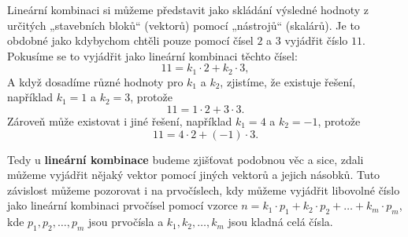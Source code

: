 \begin{remark}
    Lineární kombinaci si můžeme představit jako skládání výsledné hodnoty z určitých „stavebních bloků“ (vektorů) pomocí „nástrojů“ (skalárů).
    Je to obdobné jako kdybychom chtěli pouze pomocí čísel $2$ a $3$ vyjádřit číslo $11$. Pokusíme se to vyjádřit jako lineární kombinaci těchto čísel:
    \[
    11 = k_1 \cdot 2 + k_2 \cdot 3,
    \]
    A když dosadíme různé hodnoty pro $k_1$ a $k_2$, zjistíme, že existuje řešení, například $k_1 = 1$ a $k_2 = 3$, protože
    \[
    11 = 1 \cdot 2 + 3 \cdot 3.
    \]
    Zároveň může existovat i jiné řešení, například $k_1 = 4$ a $k_2 = -1$, protože
    \[
    11 = 4 \cdot 2 + (-1) \cdot 3.
    \]

    Tedy u \textbf{lineární kombinace} budeme zjišťovat podobnou věc a sice, zdali můžeme vyjádřit nějaký vektor pomocí jiných vektorů a jejich násobků.
    Tuto závislost můžeme pozorovat i na prvočíslech, kdy můžeme vyjádřit libovolné číslo jako lineární kombinaci prvočísel pomocí vzorce $n = k_1 \cdot p_1 + k_2 \cdot p_2 + \ldots + k_m \cdot p_m$, kde $p_1, p_2, \ldots, p_m$ jsou prvočísla a $k_1, k_2, \ldots, k_m$ jsou kladná celá čísla.
\end{remark}

